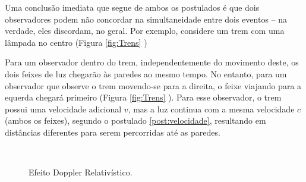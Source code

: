 Uma conclusão imediata que segue de ambos os postulados é que dois observadores podem não concordar na simultaneidade entre dois eventos -- na verdade, eles discordam, no geral. Por exemplo, considere um trem com uma lâmpada no centro (Figura \ref{fig:Trens} )

Para um observador dentro do trem, independentemente do movimento deste, os dois feixes de luz chegarão às paredes ao mesmo tempo. No entanto, para um observador que observe o trem movendo-se para a direita, o feixe viajando para a equerda chegará primeiro (Figura \ref{fig:Trens} ). Para esse observador, o trem possui uma velocidade adicional $v$, mas a luz continua com a mesma velocidade $c$ (ambos os feixes), segundo o postulado \ref{post:velocidade}, resultando em distâncias diferentes para serem percorridas até as paredes.


\begin{figure*}[t]
    \centering
    \begin{subfigure}[t]{0.5\textwidth}
        \centering
        \caption{}
        \label{fig:trem}
    \end{subfigure}%
    ~ 
    \begin{subfigure}[t]{0.5\textwidth}
        \centering
        \caption{}
        \label{fig:TremMovimento}
    \end{subfigure}
    \caption{Feixes de luz partindo do centro de um trem ao mesmo tempo para (a) um observador que anda junto ao trem e (b) para um observador que vê o trem movendo-se com velocidade $v$ para a direita.}
\label{fig:Trens}
\end{figure*}



 
\begin{figure}[th]
    \centering
    \caption{Efeito Doppler Relativístico.}
    \label{fig:doppler}
\end{figure}
